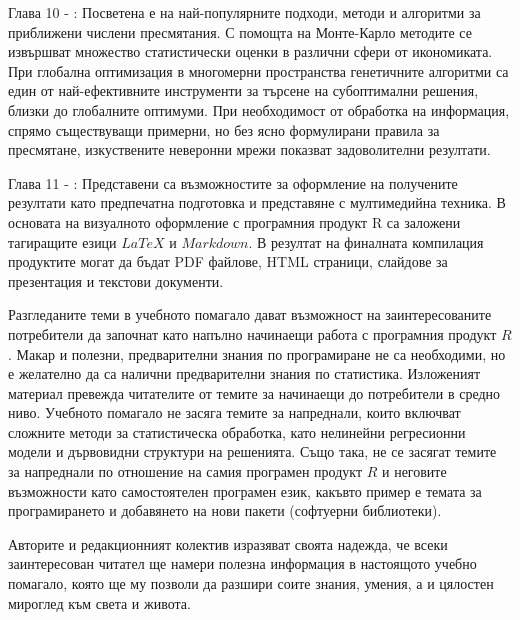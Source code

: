 Глава 10 - : Посветена е на най-популярните подходи, методи и алгоритми за приближени числени пресмятания. С помощта на Монте-Карло методите се извършват множество статистически оценки в различни сфери от икономиката. При глобална оптимизация в многомерни пространства генетичните алгоритми са един от най-ефективните инструменти за търсене на субоптимални решения, близки до глобалните оптимуми. При необходимост от обработка на информация, спрямо съществуващи примерни, но без ясно формулирани правила за пресмятане, изкуствените неверонни мрежи показват задоволителни резултати. 

Глава 11 - : Представени са възможностите за оформление на получените резултати като предпечатна подготовка и представяне с мултимедийна техника. В основата на визуалното оформление с програмния продукт R са заложени тагиращите езици $LaTeX$ и $Markdown$. В резултат на финалната компилация продуктите могат да бъдат PDF файлове, HTML страници, слайдове за презентация и текстови документи. 

Разгледаните теми в учебното помагало дават възможност на заинтересованите потребители да започнат като напълно начинаещи работа с програмния продукт $R$. Макар и полезни, предварителни знания по програмиране не са необходими, но е желателно да са налични предварителни знания по статистика. Изложеният материал превежда читателите от темите за начинаещи до потребители в средно ниво. Учебното помагало не засяга темите за напреднали, които включват сложните методи за статистическа обработка, като нелинейни регресионни модели и дървовидни структури на решенията. Също така, не се засягат темите за напреднали по отношение на самия програмен продукт $R$ и неговите възможности като самостоятелен програмен език, какъвто пример е темата за програмирането и добавянето на нови пакети (софтуерни библиотеки). 

Авторите и редакционният колектив изразяват своята надежда, че всеки заинтересован читател ще намери полезна информация в настоящото учебно помагало, която ще му позволи да разшири соите знания, умения, а и цялостен мироглед към света и живота. 

